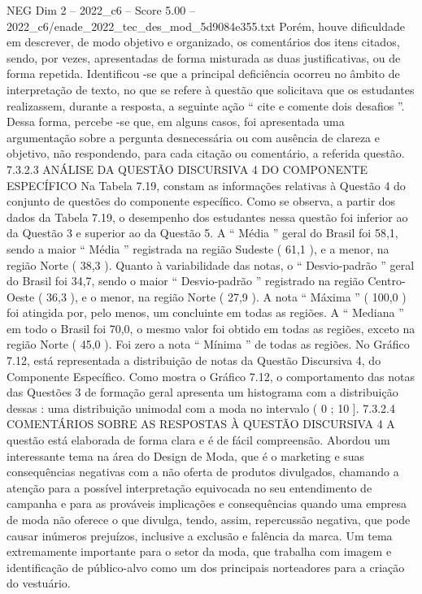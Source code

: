 \begin{textsample}{NEG Dim 2 – 2022\_c6 – Score 5.00 – 2022\_c6/enade\_2022\_tec\_des\_mod\_5d9084e355.txt}
Porém, houve dificuldade em descrever, de modo objetivo e organizado, os comentários dos itens citados, sendo, por vezes, apresentadas de forma misturada as duas justificativas, ou de forma repetida.
Identificou -se que a principal deficiência ocorreu no âmbito de interpretação de texto, no que se refere à questão que solicitava que os estudantes realizassem, durante a resposta, a seguinte ação “ cite e comente dois desafios ”.
Dessa forma, percebe -se que, em alguns casos, foi apresentada uma argumentação sobre a pergunta desnecessária ou com ausência de clareza e objetivo, não respondendo, para cada citação ou comentário, a referida questão. 7.3.2.3 ANÁLISE DA QUESTÃO DISCURSIVA 4 DO COMPONENTE ESPECÍFICO Na Tabela 7.19, constam as informações relativas à Questão 4 do conjunto de questões do componente específico.
Como se observa, a partir dos dados da Tabela 7.19, o desempenho dos estudantes nessa questão foi inferior ao da Questão 3 e superior ao da Questão 5.
A “ Média ” geral do Brasil foi 58,1, sendo a maior “ Média ” registrada na região Sudeste ( 61,1 ), e a menor, na região Norte ( 38,3 ).
Quanto à variabilidade das notas, o “ Desvio-padrão ” geral do Brasil foi 34,7, sendo o maior “ Desvio-padrão ” registrado na região Centro-Oeste ( 36,3 ), e o menor, na região Norte ( 27,9 ).
A nota “ Máxima ” ( 100,0 ) foi atingida por, pelo menos, um concluinte em todas as regiões.
A “ Mediana ” em todo o Brasil foi 70,0, o mesmo valor foi obtido em todas as regiões, exceto na região Norte ( 45,0 ).
Foi zero a nota “ Mínima ” de todas as regiões.
No Gráfico 7.12, está representada a distribuição de notas da Questão Discursiva 4, do Componente Específico.
Como mostra o Gráfico 7.12, o comportamento das notas das Questões 3 de formação geral apresenta um histograma com a distribuição dessas : uma distribuição unimodal com a moda no intervalo ( 0 ; 10 ]. 7.3.2.4 COMENTÁRIOS SOBRE AS RESPOSTAS À QUESTÃO DISCURSIVA 4 A questão está elaborada de forma clara e é de fácil compreensão.
Abordou um interessante tema na área do Design de Moda, que é o marketing e suas consequências negativas com a não oferta de produtos divulgados, chamando a atenção para a possível interpretação equivocada no seu entendimento de campanha e para as prováveis implicações e consequências quando uma empresa de moda não oferece o que divulga, tendo, assim, repercussão negativa, que pode causar inúmeros prejuízos, inclusive a exclusão e falência da marca.
Um tema extremamente importante para o setor da moda, que trabalha com imagem e identificação de público-alvo como um dos principais norteadores para a criação do vestuário.

\end{textsample}
